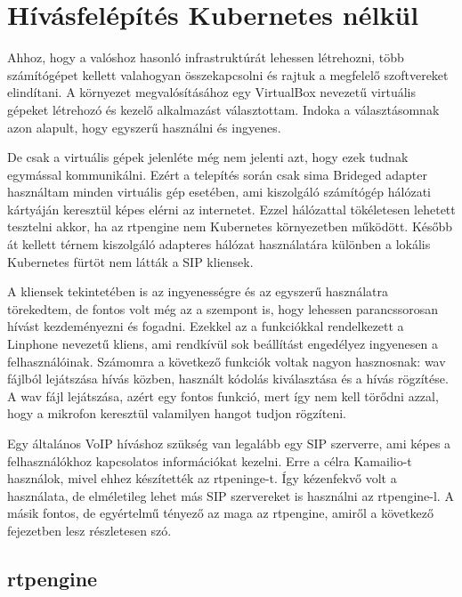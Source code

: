\chapter{Hívásfelépítés Kubernetes nélkül}

Ahhoz, hogy a valóshoz hasonló infrastruktúrát lehessen létrehozni, több 
számítógépet kellett valahogyan összekapcsolni és rajtuk a megfelelő szoftvereket
elindítani. A környezet megvalósításához egy VirtualBox nevezetű virtuális gépeket
létrehozó és kezelő alkalmazást választottam. Indoka a választásomnak azon
alapult, hogy egyszerű használni és ingyenes.

De csak a virtuális gépek jelenléte még nem jelenti azt, hogy ezek tudnak egymással
kommunikálni. Ezért a telepítés során csak sima Brideged adapter használtam minden
virtuális gép esetében, ami kiszolgáló számítógép hálózati kártyáján keresztül
képes elérni az internetet. Ezzel hálózattal tökéletesen lehetett tesztelni
akkor, ha az rtpengine nem Kubernetes környezetben működött. Később át kellett
térnem kiszolgáló adapteres hálózat használatára különben a lokális Kubernetes 
fürtöt nem látták a SIP kliensek. 

A kliensek tekintetében is az ingyenességre és az egyszerű használatra törekedtem, 
de fontos volt még az a szempont is, hogy lehessen parancssorosan hívást kezdeményezni
és fogadni. Ezekkel az a funkciókkal rendelkezett a Linphone nevezetű kliens, ami
rendkívül sok beállítást engedélyez ingyenesen a felhasználóinak. Számomra a következő
funkciók voltak nagyon hasznosnak: wav fájlból lejátszása hívás közben, használt kódolás
kiválasztása és a hívás rögzítése. A wav fájl lejátszása, azért egy fontos funkció, mert
így nem kell törődni azzal, hogy a mikrofon keresztül valamilyen hangot tudjon rögzíteni.

Egy általános VoIP híváshoz szükség van legalább egy SIP szerverre, ami képes a felhasználókhoz
kapcsolatos információkat kezelni. Erre a célra Kamailio-t használok, mivel ehhez készítették
az rtpeninge-t. Így kézenfekvő volt a használata, de elméletileg lehet más SIP szervereket
is használni az rtpengine-l. A másik fontos, de egyértelmű tényező az maga az rtpengine, 
amiről a következő fejezetben lesz részletesen szó. 

\section{rtpengine}

